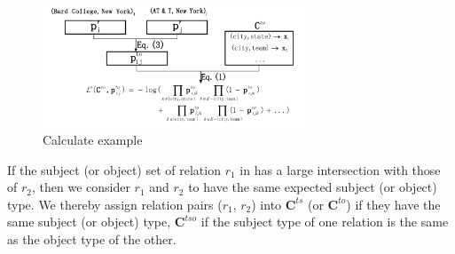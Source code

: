 \begin{figure}
	\centering
	\includegraphics[width=8cm]{./result-figure/example.pdf}
	\vspace{-2em}
	\caption{Calculate example}
	\label{fig:example}
	\vspace{-1.5em}
\end{figure}


If the subject (or object) set of relation $r_1$ in \KB has a large intersection with those of $r_2$, then we consider $r_1$ and $r_2$ to have the same expected subject (or object) type.
We thereby assign relation pairs ($r_1$, $r_2$) into $\bm{C}^{ts}$ (or $\bm{C}^{to}$) if they have the same subject (or object) type,
$\bm{C}^{tso}$  if the subject type of one relation is the same as the object type of the other.
